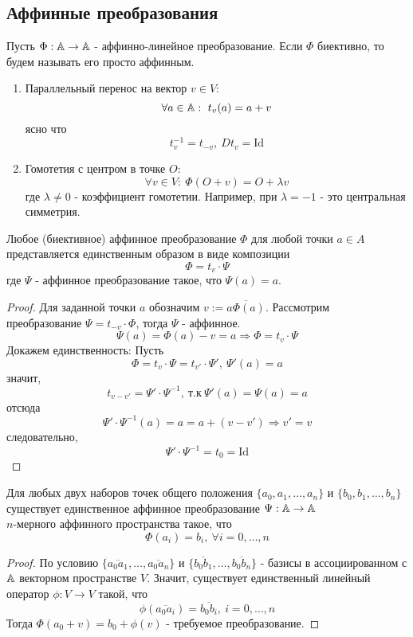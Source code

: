 \subsection{Аффинные преобразования}
\begin{definition}
    Пусть $\Phi:\mathbb{A}\to \mathbb{A}$ - аффинно-линейное преобразование. Если $\Phi$ биективно, то будем называть его просто аффинным.
\end{definition} 
\begin{example}\tab
    \begin{enumerate}
        \item Параллельный перенос на вектор $v\in V$:
        \[\forall a\in \mathbb{A}:\ t_v(a)=a+v\]
        ясно что 
        \[t^{-1}_v=t_{-v},\ Dt_v=\text{Id}\]
        \item Гомотетия с центром в точке $O$:
        \[\forall v\in V:\ \Phi(O+v)=O+\lambda v\]
        где $\lambda\ne 0$ - коэффициент гомотетии.
        Например, при $\lambda=-1$ - это центральная симметрия.
    \end{enumerate}
\end{example}
\begin{theorem}
    Любое (биективное) аффинное преобразование $\Phi$ для любой точки $a\in A$ представляется единственным образом в виде композиции 
    \[\Phi=t_v\cdot \Psi\]
    где $\Psi$ - аффинное преобразование такое, что $\Psi(a)=a$. 
\end{theorem} 
\begin{proof}
    Для заданной точки $a$ обозначим $v:=\overline{a\Phi(a)}$. Рассмотрим преобразование $\Psi = t_{-v}\cdot \Phi$, тогда $\Psi$ - аффинное.
    \[\Psi(a)=\Phi(a)-v=a \Longrightarrow \Phi=t_v\cdot \Psi\]
    Докажем единственность: Пусть 
    \[\Phi=t_v\cdot \Psi=t_{v'}\cdot \Psi',\ \Psi'(a)=a\]
    значит,
    \[t_{v-v'}=\Psi'\cdot\Psi^{-1},\ \text{т.к}\ \Psi'(a)=\Psi(a)=a\]
    отсюда
    \[\Psi'\cdot \Psi^{-1}(a)=a=a+(v-v') \Longrightarrow v'=v\]
    следовательно,
    \[\Psi'\cdot\Psi^{-1}=t_0=\text{Id}\]
\end{proof} 
\begin{theorem}
    Для любых двух наборов точек общего положения $\{a_0, a_1,\dots,a_n\}$ и $\{b_0,b_1,\dots,b_n\}$ существует единственное аффинное преобразование $\Psi: \mathbb{A}\to \mathbb{A}$\\
    $n$-мерного аффинного пространства такое, что
    \[\Phi(a_i)=b_i,\ \forall i=0,\dots,n\]
\end{theorem} 
\begin{proof}
    По условию $\{\overline{a_0a_1},\dots,\overline{a_0a_n}\}$ и $\{\overline{b_0b_1},\dots,\overline{b_0b_n}\}$ - базисы в ассоциированном с $\mathbb{A}$ векторном пространстве $V$. Значит, существует единственный линейный оператор $\phi: V\to V$ такой, что
    \[\phi(\overline{a_0a_i})=\overline{b_0b_i},\ i=0,\dots, n\]
    Тогда $\Phi(a_0+v)=b_0+\phi(v)$ - требуемое преобразование.
\end{proof} 
